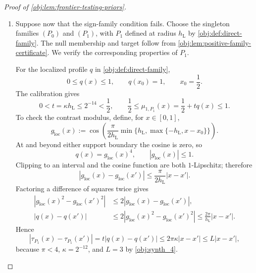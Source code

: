 \begin{proof}[Proof of \cref{obj:lem:frontier-testing-priors}]
\begin{enumerate}
The component estimate in
\cref{obj:lem:measurable-component-contraction} uses Cayley's labeled-tree
enumeration from
\citep[Section~5.6, Theorem~5.40]{KellerTrotterAppliedCombinatorics}.
With the occupancy condition just established, that estimate supplies
\[
d_{\mathrm{TV}}(MQ_n,MQ^{(0)})
\le2048\epsilon t n^2h_{\mathrm L}\delta_{\mathrm L}.
\]
The identity
\[
b_n^7=(n^2\epsilon)^{-1}
\]
calibrates its right-hand side:
\[
\begin{aligned}
2048\epsilon t n^2h_{\mathrm L}\delta_{\mathrm L}
&=2048\epsilon\kappa n^2h_{\mathrm L}^{7}\\
&=\frac{2048\kappa}{4^7}(n^2\epsilon)b_n^7\\
&=\frac{2048\kappa}{4^7}
 =2^{-15}\le\frac14.
\end{aligned}
\]
Symmetry therefore yields the required bound for
\(d_{\mathrm{TV}}(MQ^{(0)},MQ^{(1)})\).

\item Suppose now that the sign-family condition fails. Choose the singleton
families \((P_0)\) and \((P_1)\), with \(P_1\) defined at radius
\(h_{\mathrm L}\) by \cref{obj:def:direct-family}. The null membership and
target follow from \cref{obj:lem:positive-family-certificate}. We verify
the corresponding properties of \(P_1\).

For the localized profile \(q\) in \cref{obj:def:direct-family},
\[
0\le q(x)\le1,\qquad q(x_0)=1,\qquad x_0=\frac12.
\]
The calibration gives
\[
0<t=\kappa h_{\mathrm L}\le2^{-14}<\frac12,
\qquad
\frac12\le\mu_{1,P_1}(x)=\frac12+tq(x)\le1.
\]
To check the contrast modulus, define, for \(x\in[0,1]\),
\[
g_{\mathrm{loc}}(x)
:=\cos\!\left(
\frac{\pi}{2h_{\mathrm L}}
\min\{h_{\mathrm L},\max\{-h_{\mathrm L},x-x_0\}\}
\right).
\]
At and beyond either support boundary the cosine is zero, so
\[
q(x)=g_{\mathrm{loc}}(x)^4,\qquad |g_{\mathrm{loc}}(x)|\le1.
\]
Clipping to an interval and the cosine function are both \(1\)-Lipschitz;
therefore
\[
|g_{\mathrm{loc}}(x)-g_{\mathrm{loc}}(x')|
\le\frac{\pi}{2h_{\mathrm L}}|x-x'|.
\]
Factoring a difference of squares twice gives
\[
\begin{aligned}
|g_{\mathrm{loc}}(x)^2-g_{\mathrm{loc}}(x')^2|
&\le2|g_{\mathrm{loc}}(x)-g_{\mathrm{loc}}(x')|,\\
|q(x)-q(x')|
&\le2|g_{\mathrm{loc}}(x)^2-g_{\mathrm{loc}}(x')^2|
 \le\frac{2\pi}{h_{\mathrm L}}|x-x'|.
\end{aligned}
\]
Hence
\[
|\tau_{P_1}(x)-\tau_{P_1}(x')|
=t|q(x)-q(x')|
\le2\pi\kappa|x-x'|
\le L|x-x'|,
\]
because \(\pi<4\), \(\kappa=2^{-12}\), and \(L=3\) by
\cref{obj:synth_4}.


\end{enumerate}
\end{proof}
